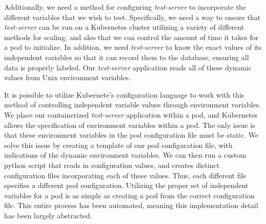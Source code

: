 Additionally, we need a method for configuring
\textit{test-server} to incorporate the different variables that we wish to
test. Specifically, we need a way to ensure that \textit{test-server} can be run
on a Kubernetes cluster utilizing a variety of different methods for scaling,
and also that we can control the amount of time it takes for a pod to
initialize. In addition, we need \textit{test-server} to know the exact values
of its independent variables so that it can record them to the database,
ensuring all data is properly labeled. Our \textit{test-server} application
reads all of these dynamic values from Unix environment variables.

It is possible to utilize Kubernete's configuration language to work with this
method of controlling independent variable values through environment variables.
We place our containerized \textit{test-server} application within a pod, and
Kubernetes allows the specification of environment variables within a pod. The
only issue is that these environment variables in the pod configuration file
must be static. We solve this issue by creating a template of our pod
configuration file, with indications of the dynamic environment variables. We
can then run a custom python script that reads in configuration values, and creates
distinct configuration files incorporating each of these values. Thus, each
different file specifies a different pod configuration. Utilizing the proper
set of independent variables for a pod is as simple as creating a pod from the
correct configuration file. This entire process has been automated, meaning this
implementation detail has been largely abstracted.
